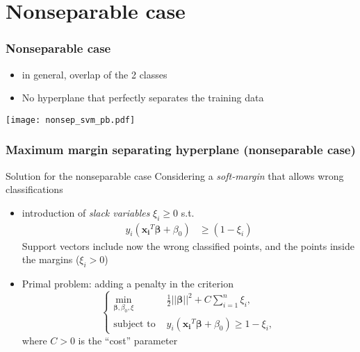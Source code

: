 \documentclass[compress, smaller, serif, 9pt]{beamer}
\newcommand{\doigtr}{\alert{\noindent \Pisymbol{pzd}{43}}}
\newcommand{\bbeta}{{\boldsymbol{\beta}}}
\begin{document}
\section{Nonseparable case}

\begin{frame}
   \frametitle{Nonseparable case}
   \begin{block}{}
      \begin{itemize}
      \item in general, overlap of the 2 classes
      \item[\doigtr] No hyperplane that perfectly separates the training data
      \end{itemize}
    \end{block}

   \begin{center}
      \texttt{[image: nonsep\_svm\_pb.pdf]}
   \end{center}
\end{frame}


\begin{frame}
   \frametitle{Maximum margin separating hyperplane (nonseparable case)}
   \begin{block}{Solution for the nonseparable case}
   Considering a {\em soft-margin} that allows  wrong classifications
      \begin{itemize}
      \item introduction of {\em slack variables} $\xi_i\ge 0$ s.t.
     \begin{align*}
         y_i(\boldsymbol{x_i}^T \boldsymbol{\beta} + \beta_0) & \ge (1-\xi_i)
      \end{align*}
      Support vectors include now the wrong classified points, and the points inside the margins ($\xi_i > 0$)
     \item Primal problem: adding a penalty in the criterion
     $$\left\{ \begin{array}{ll}
       \min_{\bbeta,\beta_0,\xi} & \frac{1}{2} || \boldsymbol{\beta}||^2 + C \sum_{i=1}^n \xi_i,\\
       \textrm{subject to } &   y_i(\boldsymbol{x_i}^T \boldsymbol{\beta} + \beta_0)  \ge 1-\xi_i, 
      \end{array} \right.$$
      where $C>0$ is the ``cost'' parameter
      \end{itemize}
    \end{block}

\end{frame}
\end{document}

